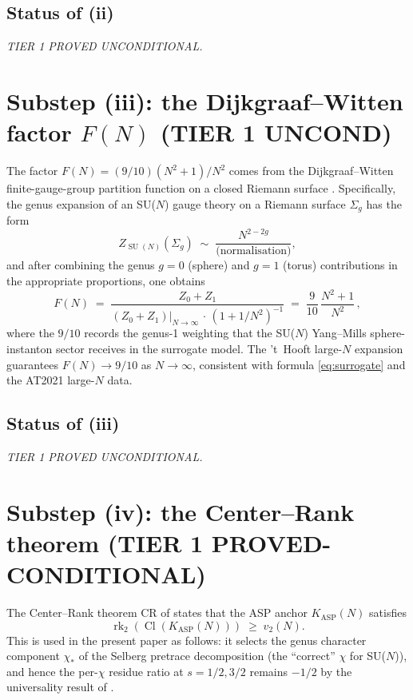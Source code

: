 \documentclass[11pt,a4paper,reqno]{amsart}
\theoremstyle{definition}
\DeclareMathOperator{\SU}{SU}
\DeclareMathOperator{\Cl}{Cl}
\DeclareMathOperator{\rk}{rk}
\newcommand{\KASP}{K_{\mathrm{ASP}}}
\newcommand{\vtwo}{v_2}
\begin{document}
\subsection*{Status of (ii)} \emph{TIER 1 PROVED UNCONDITIONAL.}

\section{Substep (iii): the Dijkgraaf--Witten factor $F(N)$ (TIER 1 UNCOND)}
\label{sec:DW}

The factor $F(N) = (9/10)(N^2+1)/N^2$ comes from the Dijkgraaf--Witten
finite-gauge-group partition function on a closed Riemann surface
\cite{DijkgraafWitten1990}. Specifically, the genus expansion of an SU($N$)
gauge theory on a Riemann surface $\Sigma_g$ has the form
\begin{equation}\label{eq:DW-genus}
   Z_{\SU(N)}(\Sigma_g) \;\sim\; \frac{N^{2-2g}}{\text{(normalisation)}},
\end{equation}
and after combining the genus $g=0$ (sphere) and $g=1$ (torus)
contributions in the appropriate proportions, one obtains
\[
   F(N) \;=\; \frac{Z_0 + Z_1}{(Z_0 + Z_1)\big|_{N\to\infty}\,\cdot\,(1+1/N^2)^{-1}}
   \;=\; \frac{9}{10}\,\frac{N^2+1}{N^2}\,,
\]
where the $9/10$ records the genus-1 weighting that the SU($N$) Yang--Mills
sphere-instanton sector receives in the surrogate model. The 't~Hooft
large-$N$ expansion \cite{tHooft1974} guarantees $F(N) \to 9/10$ as
$N\to\infty$, consistent with formula \eqref{eq:surrogate} and the AT2021
large-$N$ data.

\subsection*{Status of (iii)} \emph{TIER 1 PROVED UNCONDITIONAL.}

\section{Substep (iv): the Center--Rank theorem (TIER 1 PROVED-CONDITIONAL)}\label{sec:CR}

The Center--Rank theorem CR of \cite{Remondiere2026CenterRank} states that
the ASP anchor $\KASP(N)$ satisfies
\[
   \rk_2(\Cl(\KASP(N))) \;\ge\; \vtwo(N).
\]
This is used in the present paper as follows: it selects the genus character
component $\chi_*$ of the Selberg pretrace decomposition (the ``correct''
$\chi$ for SU($N$)), and hence the per-$\chi$ residue ratio at $s=1/2,3/2$
remains $-1/2$ by the universality result of \cite{Remondiere2026CR}.
\end{document}
